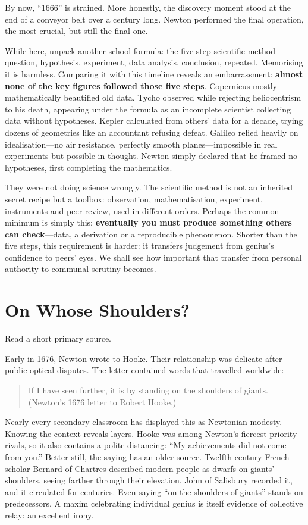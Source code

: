 By now, ``1666'' is strained. More honestly, the discovery moment stood at the end of a conveyor belt over a century long. Newton performed the final operation, the most crucial, but still the final one.

While here, unpack another school formula: the five-step scientific method---question, hypothesis, experiment, data analysis, conclusion, repeated. Memorising it is harmless. Comparing it with this timeline reveals an embarrassment: \textbf{almost none of the key figures followed those five steps}. Copernicus mostly mathematically beautified old data. Tycho observed while rejecting heliocentrism to his death, appearing under the formula as an incomplete scientist collecting data without hypotheses. Kepler calculated from others' data for a decade, trying dozens of geometries like an accountant refusing defeat. Galileo relied heavily on idealisation---no air resistance, perfectly smooth planes---impossible in real experiments but possible in thought. Newton simply declared that he framed no hypotheses, first completing the mathematics.

They were not doing science wrongly. The scientific method is not an inherited secret recipe but a toolbox: observation, mathematisation, experiment, instruments and peer review, used in different orders. Perhaps the common minimum is simply this: \textbf{eventually you must produce something others can check}---data, a derivation or a reproducible phenomenon. Shorter than the five steps, this requirement is harder: it transfers judgement from genius's confidence to peers' eyes. We shall see how important that transfer from personal authority to communal scrutiny becomes.

\section{On Whose Shoulders?}
Read a short primary source.

Early in 1676, Newton wrote to Hooke. Their relationship was delicate after public optical disputes. The letter contained words that travelled worldwide:

\begin{quote}
If I have seen further, it is by standing on the shoulders of giants. (Newton's 1676 letter to Robert Hooke.)
\end{quote}
Nearly every secondary classroom has displayed this as Newtonian modesty. Knowing the context reveals layers. Hooke was among Newton's fiercest priority rivals, so it also contains a polite distancing: ``My achievements did not come from you.'' Better still, the saying has an older source. Twelfth-century French scholar Bernard of Chartres described modern people as dwarfs on giants' shoulders, seeing farther through their elevation. John of Salisbury recorded it, and it circulated for centuries. Even saying ``on the shoulders of giants'' stands on predecessors. A maxim celebrating individual genius is itself evidence of collective relay: an excellent irony.

